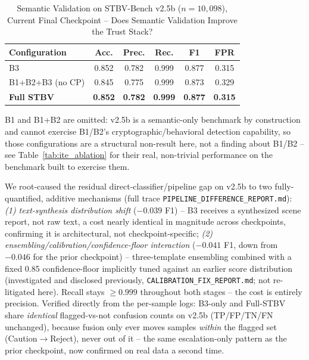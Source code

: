 \documentclass[conference]{IEEEtran}
\begin{document}
\begin{table}[t]
\centering
\caption{Semantic Validation on STBV-Bench v2.5b ($n{=}10{,}098$), Current Final Checkpoint -- Does Semantic Validation Improve the Trust Stack?}
\label{tab:v25b_pipeline}
\footnotesize
\begin{tabular}{@{}lccccc@{}}
\toprule
Configuration & Acc. & Prec. & Rec. & F1 & FPR \\
\midrule
B3 & 0.852 & 0.782 & 0.999 & 0.877 & 0.315 \\
B1+B2+B3 (no CP) & 0.845 & 0.775 & 0.999 & 0.873 & 0.329 \\
\textbf{Full STBV} & \textbf{0.852} & \textbf{0.782} & \textbf{0.999} & \textbf{0.877} & \textbf{0.315} \\
\bottomrule
\end{tabular}
\par\vspace{2pt}\raggedright\footnotesize
B1 and B1+B2 are omitted: v2.5b is a semantic-only benchmark by construction and cannot exercise B1/B2's cryptographic/behavioral detection capability, so those configurations are a structural non-result here, not a finding about B1/B2 -- see Table~\ref{tab:ite_ablation} for their real, non-trivial performance on the benchmark built to exercise them.
\end{table}

We root-caused the residual direct-classifier/pipeline gap on v2.5b to two fully-quantified, additive mechanisms (full trace \texttt{PIPELINE\_DIFFERENCE\_REPORT.md}): \emph{(1) text-synthesis distribution shift} ($-0.039$ F1) -- B3 receives a synthesized scene report, not raw text, a cost nearly identical in magnitude across checkpoints, confirming it is architectural, not checkpoint-specific; \emph{(2) ensembling/calibration/confidence-floor interaction} ($-0.041$ F1, down from $-0.046$ for the prior checkpoint) -- three-template ensembling combined with a fixed 0.85 confidence-floor implicitly tuned against an earlier score distribution (investigated and disclosed previously, \texttt{CALIBRATION\_FIX\_REPORT.md}; not re-litigated here). Recall stays $\geq0.999$ throughout both stages -- the cost is entirely precision. Verified directly from the per-sample logs: B3-only and Full-STBV share \emph{identical} flagged-vs-not confusion counts on v2.5b (TP/FP/TN/FN unchanged), because fusion only ever moves samples \emph{within} the flagged set (Caution$\to$Reject), never out of it -- the same escalation-only pattern as the prior checkpoint, now confirmed on real data a second time.
\end{document}
